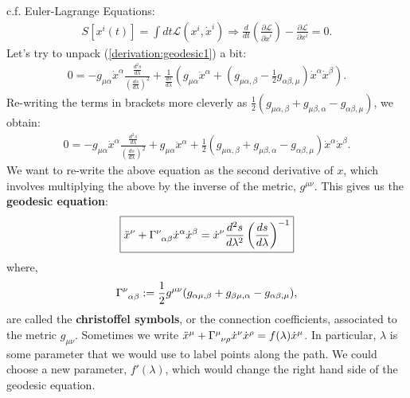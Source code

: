 \documentclass[11pt]{article}
\newcommand{\grmetric}[0]{g_{\mu \nu}}
\theoremstyle{definition}
\begin{document}
c.f. Euler-Lagrange Equations: 
\begin{align*}
	S[x^i (t) ] = \int dt \mathcal{L}(x^i,\dot{x}^i) \Rightarrow \frac{d}{dt} \left( \frac{\partial \mathcal{L}}{\partial \dot{x}^i} \right) - \frac{\partial \mathcal{L}}{\partial x^i} = 0.
\end{align*}
Let's try to unpack (\ref{derivation:geodesic1}) a bit: 
\begin{align*}
	0 = - g_{\mu \alpha}\dot{x}^\alpha \frac{\frac{d^2s}{d \lambda}}{\left( \frac{ds}{d \lambda} \right)^2} + \frac{1}{\frac{ds}{d \lambda}} \left( g_{\mu \alpha} \ddot{x}^\alpha  + ( g_{\mu \alpha, \beta} - \frac{1}{2} g_{\alpha \beta, \mu} ) \dot{x}^\alpha \dot{x}^\beta \right).
\end{align*}
Re-writing the terms in brackets more cleverly as \( \frac{1}{2} ( g_{\mu \alpha, \beta} + g_{\mu \beta, \alpha} - g_{\alpha \beta, \mu} ) \), we obtain: 
\begin{align*}
	0 =  - g_{\mu \alpha}\dot{x}^\alpha \frac{\frac{d^2s}{d \lambda}}{\left( \frac{ds}{d \lambda} \right)^2} + g_{\mu \alpha} \ddot{x}^\alpha + \frac{1}{2} (g_{\mu \alpha, \beta} + g_{\mu \beta, \alpha} - g_{\alpha \beta, \mu} ) \dot{x}^\alpha \dot{x}^\beta.
\end{align*}
We want to re-write the above equation as the second derivative of \( x \), which involves multiplying the above by the inverse of the metric, \( g^{\mu \nu} \). This gives us the \textbf{geodesic equation}: 
\begin{align}\label{eqn:geodesiceqn}
	\boxed{\ddot{x}^\nu + \tensor{\Gamma}{^\nu_{\alpha \beta}} \dot{x}^\alpha \dot{x}^\beta = \dot{x}^\nu \frac{d^2s}{d\lambda^2} \left( \frac{ds}{d \lambda} \right)^{-1} }
\end{align}
where, 
\begin{align}\label{eqn:christoffel}
	\tensor{\Gamma}{^\nu_{\alpha \beta}} := \frac{1}{2} g^{\mu \nu} ( g_{\alpha \mu, \beta} + g_{\beta \mu, \alpha} - g_{\alpha \beta, \mu} ),
\end{align}
are called the \textbf{christoffel symbols}, or the connection coefficients, associated to the metric \( \grmetric \). Sometimes we write \( \ddot{x}^\mu + \tensor{\Gamma}{^\mu_{\nu \rho}} \dot{x}^\nu \dot{x}^\rho = f(\lambda) \dot{x}^\mu \). In particular, \( \lambda \) is some parameter that we would use to label points along the path. We could choose a new parameter, \( f'(\lambda) \), which would change the right hand side of the geodesic equation.
\newline
\newline
\end{document}
